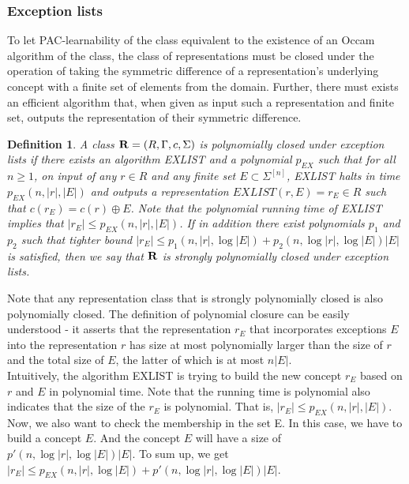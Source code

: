 \documentclass[12pt]{article}
\newtheorem{definition}[theorem]{Definition}
\begin{document}
\subsubsection{Exception lists}

To let PAC-learnability of the class equivalent to the existence of an Occam algorithm of the class, the class of representations must be closed under the operation of taking the symmetric difference of a representation's underlying concept with a finite set of elements from the domain. Further, there must exists an efficient algorithm that, when given as input such a representation and finite set, outputs the representation of their symmetric difference.

\begin{definition} \label{definition:close}
A class ${\bf R} = (R, \Gamma, c, \Sigma)$ is \emph {polynomially closed under exception lists} if there exists an algorithm EXLIST and a polynomial $p_{EX}$ such that for all $n \ge 1$, on input of any $r \in R$ and any finite set $E \subset \Sigma^{[n]}$, EXLIST halts in time $p_{EX}(n, |r|, |E|)$ and outputs a representation $EXLIST(r, E) = r_E \in R$ such that $c(r_E) = c(r) \oplus E$. Note that the polynomial running time of EXLIST implies that $|r_E| \le p_{EX}(n, |r|, |E|)$. If in addition there exist polynomials $p_1$ and $p_2$ such that tighter bound $|r_E| \le p_1(n, |r|, \log |E|) + p_2(n, \log |r|, \log |E|)|E|$ is satisfied, then we say that ${\bf R}$ is \emph {strongly polynomially closed under exception lists}.
\end{definition}

Note that any representation class that is strongly polynomially closed is also polynomially closed. The definition of polynomial closure can be easily understood - it asserts that the representation $r_E$ that incorporates exceptions $E$ into the representation $r$ has size at most polynomially larger than the size of $r$ and the total size of $E$, the latter of which is at most $n|E|$. \\

Intuitively, the algorithm EXLIST is trying to build the new concept $r_E$ based on  $r$ and $E$ in polynomial time. Note that the running time is polynomial also indicates that the size of the $r_E$ is polynomial. That is, $|r_E| \le p_{EX}(n, |r|, |E|)$. Now, we also want to check the membership in the set E. In this case, we have to build a concept $E$. And the concept $E$ will have a size of $p'(n, \log |r|, \log |E|)|E|$. To sum up, we get $|r_E| \le p_{EX}(n, |r|, \log |E|) + p'(n, \log |r|, \log |E|)|E|$.
\end{document}
